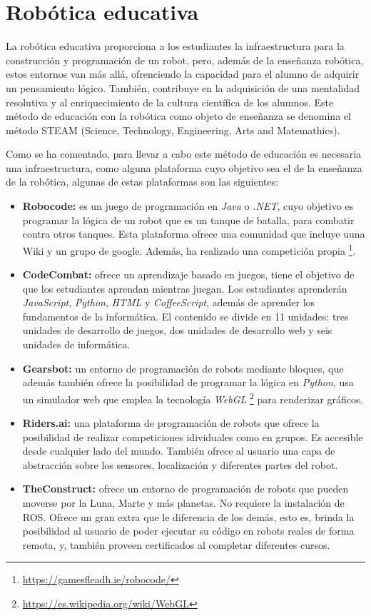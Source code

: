 \documentclass[a4paper, 12pt]{book}
\begin{document}
\section{Robótica educativa}
\label{sec:robotica educativa}

La robótica educativa proporciona a los estudiantes la infraestructura para la construcción y programación de un robot, pero, además de la enseñanza robótica,
estos entornos van más allá, ofrenciendo la capacidad para el alumno de adquirir un pensamiento lógico. También, contribuye en la adquisición de una mentalidad resolutiva y al enriquecimiento de la cultura científica de los alumnos. Este método de educación con la robótica como objeto de enseñanza se denomina el método STEAM (Science, Technology, Engineering, Arts and Matemathics).

Como se ha comentado, para llevar a cabo este método de educación es necesaria una infraestructura, como alguna plataforma cuyo objetivo sea el de la enseñanza de la robótica, algunas de estas plataformas son las siguientes:

\begin{itemize}
\item \textbf{Robocode:} es un juego de programación en \emph{Java} o \emph{.NET}, cuyo objetivo es programar la lógica de un robot que es un tanque de batalla, para combatir contra otros tanques. Esta plataforma ofrece una comunidad que incluye uuna Wiki y un grupo de google. Además, ha realizado una competición propia \footnote{\url{https://gamesfleadh.ie/robocode/}}.
\item \textbf{CodeCombat:} ofrece un aprendizaje basado en juegos, tiene el objetivo de que los estudiantes aprendan mientras juegan. Los estudiantes aprenderán \emph{JavaScript}, \emph{Python}, \emph{HTML} y \emph{CoffeeScript}, además de aprender los fundamentos de la informática. El contenido se divide en 11 unidades: tres unidades de desarrollo de juegos, dos unidades de desarrollo web y seis unidades de informática.
\item \textbf{Gearsbot:} un entorno de programación de robots mediante bloques, que además también ofrece la posibilidad de programar la lógica en \emph{Python}, usa un simulador web que emplea la tecnología \emph{WebGL} \footnote{\url{https://es.wikipedia.org/wiki/WebGL}} para renderizar gráficos.
\item \textbf{Riders.ai:} una plataforma de programación de robots que ofrece la posibilidad de realizar competiciones idividuales como en grupos. Es accesible desde cualquier lado del mundo. También ofrece al usuario una capa de abstracción sobre los sensores, localización y diferentes partes del robot.
\item \textbf{TheConstruct:} ofrece un entorno de programación de robots que pueden moverse por la Luna, Marte y más planetas. No requiere la instalación de ROS. Ofrece un gran extra que le diferencia de los demás, esto es, brinda la posibilidad al usuario de poder ejecutar su código en robots reales de forma remota, y, también proveen certificados al completar diferentes cursos.
\end{itemize}
\end{document}
